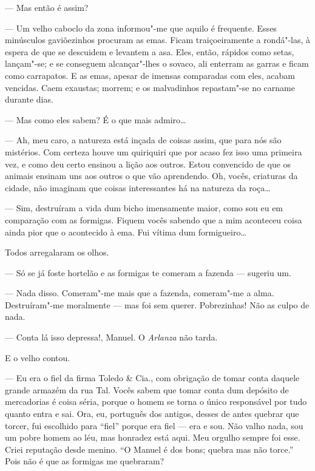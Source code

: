 --- Mas então é assim?

--- Um velho caboclo da zona informou"-me que aquilo é frequente. Esses
minúsculos gaviõezinhos procuram as emas. Ficam traiçoeiramente a
rondá"-las, à espera de que se descuidem e levantem a asa. Eles, então,
rápidos como setas, lançam"-se; e se conseguem alcançar"-lhes o sovaco,
ali enterram as garras e ficam como carrapatos. E as emas, apesar de
imensas comparadas com eles, acabam vencidas. Caem exaustas; morrem; e
os malvadinhos repastam"-se no carname durante dias.

--- Mas como eles sabem? É o que mais admiro\ldots{}

--- Ah, meu caro, a natureza está inçada de coisas assim, que para nós
são mistérios. Com certeza houve um quiriquiri que por acaso fez isso
uma primeira vez, e como deu certo ensinou a lição aos outros. Estou
convencido de que os animais ensinam uns aos outros o que vão
aprendendo. Oh, vocês, criaturas da cidade, não imaginam que coisas
interessantes há na natureza da roça\ldots{}


--- Sim, destruíram a vida dum bicho imensamente maior, como sou eu em
comparação com as formigas. Fiquem vocês sabendo que a mim aconteceu
coisa ainda pior que o acontecido à ema. Fui vítima dum formigueiro\ldots{}

Todos arregalaram os olhos.

--- Só se já foste hortelão e as formigas te comeram a fazenda ---
sugeriu um.

--- Nada disso. Comeram"-me mais que a fazenda, comeram"-me a alma.
Destruíram"-me moralmente --- mas foi sem querer. Pobrezinhas! Não as
culpo de nada.

--- Conta lá isso depressa!, Manuel. O \emph{Arlanza} não tarda.

E o velho contou.

--- Eu era o fiel da firma Toledo \& Cia., com obrigação de tomar conta
daquele grande armazém da rua Tal. Vocês sabem que tomar conta dum
depósito de mercadorias é coisa séria, porque o homem se torna o único
responsável por tudo quanto entra e sai. Ora, eu, português dos antigos,
desses de antes quebrar que torcer, fui escolhido para ``fiel'' porque
era fiel --- era e sou. Não valho nada, sou um pobre homem ao léu, mas
honradez está aqui. Meu orgulho sempre foi esse. Criei reputação desde
menino. ``O Manuel é dos bons; quebra mas não torce.'' Pois não é que as
formigas me quebraram?

